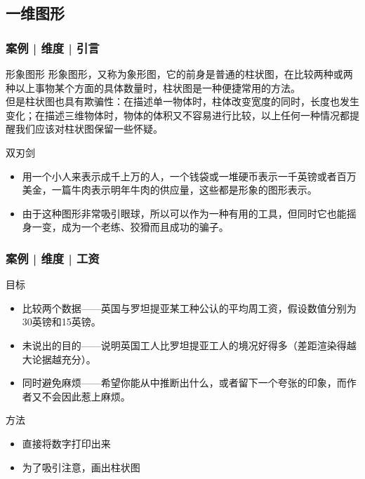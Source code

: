 \subsection{一维图形}
\begin{frame}
  \frametitle{案例 | 维度 | 引言}
  \begin{block}{形象图形}
    形象图形，又称为象形图，它的前身是普通的柱状图，在比较两种或两种以上事物某个方面的具体数量时，柱状图是一种便捷常用的方法。\\
但是柱状图也具有欺骗性：在描述单一物体时，柱体改变宽度的同时，长度也发生变化；在描述三维物体时，物体的体积又不容易进行比较，以上任何一种情况都提醒我们应该对柱状图保留一些怀疑。\\
  \end{block}
  \pause
  \begin{block}{双刃剑}
    \begin{itemize}
      \item 用一个小人来表示成千上万的人，一个钱袋或一堆硬币表示一千英镑或者百万美金，一篇牛肉表示明年牛肉的供应量，这些都是形象的图形表示。
      \item 由于这种图形非常吸引眼球，所以可以作为一种有用的工具，但同时它也能摇身一变，成为一个老练、狡猾而且成功的骗子。
    \end{itemize}
  \end{block}
\end{frame}

\begin{frame}
  \frametitle{案例 | 维度 | 工资}
  \begin{block}{目标}
    \begin{itemize}
      \item 比较两个数据——英国与罗坦提亚某工种公认的平均周工资，假设数值分别为30英镑和15英镑。
      \item 未说出的目的——说明英国工人比罗坦提亚工人的境况好得多（差距渲染得越大论据越充分）。
      \item 同时避免麻烦——希望你能从中推断出什么，或者留下一个夸张的印象，而作者又不会因此惹上麻烦。
    \end{itemize}
  \end{block}
  \pause
  \begin{block}{方法}
    \begin{itemize}
      \item 直接将数字打印出来
      \item 为了吸引注意，画出柱状图
    \end{itemize}
  \end{block}
\end{frame}

